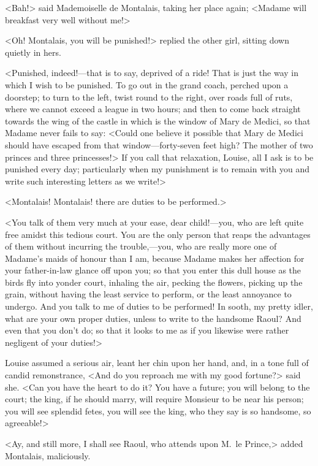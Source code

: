 <Bah!> said Mademoiselle de Montalais, taking her place again; <Madame will breakfast very well without me!>

<Oh! Montalais, you will be punished!> replied the other girl, sitting down quietly in hers.

<Punished, indeed!—that is to say, deprived of a ride! That is just the way in which I wish to be punished. To go out in the grand coach, perched upon a doorstep; to turn to the left, twist round to the right, over roads full of ruts, where we cannot exceed a league in two hours; and then to come back straight towards the wing of the castle in which is the window of Mary de Medici, so that Madame never fails to say: <Could one believe it possible that Mary de Medici should have escaped from that window—forty-seven feet high? The mother of two princes and three princesses!> If you call that relaxation, Louise, all I ask is to be punished every day; particularly when my punishment is to remain with you and write such interesting letters as we write!>

<Montalais! Montalais! there are duties to be performed.>

<You talk of them very much at your ease, dear child!—you, who are left quite free amidst this tedious court. You are the only person that reaps the advantages of them without incurring the trouble,—you, who are really more one of Madame's maids of honour than I am, because Madame makes her affection for your father-in-law glance off upon you; so that you enter this dull house as the birds fly into yonder court, inhaling the air, pecking the flowers, picking up the grain, without having the least service to perform, or the least annoyance to undergo. And you talk to me of duties to be performed! In sooth, my pretty idler, what are your own proper duties, unless to write to the handsome Raoul? And even that you don't do; so that it looks to me as if you likewise were rather negligent of your duties!>

Louise assumed a serious air, leant her chin upon her hand, and, in a tone full of candid remonstrance, <And do you reproach me with my good fortune?> said she. <Can you have the heart to do it? You have a future; you will belong to the court; the king, if he should marry, will require Monsieur to be near his person; you will see splendid fetes, you will see the king, who they say is so handsome, so agreeable!>

<Ay, and still more, I shall see Raoul, who attends upon M.~le Prince,> added Montalais, maliciously.

